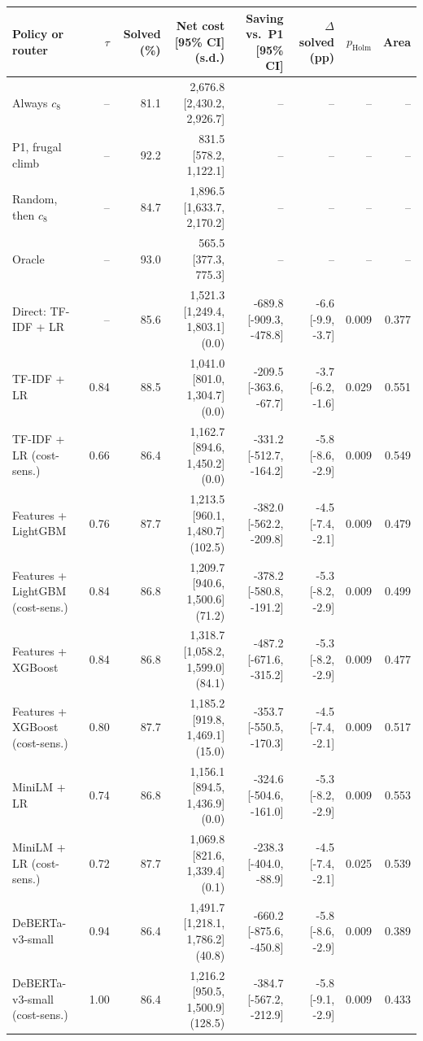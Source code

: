 \setlength{\tabcolsep}{4pt}
\begin{tabular}{@{}lrrrrrrr@{}}
\toprule
Policy or router & $\tau$ & Solved (\%) & Net cost [95\% CI] (s.d.) & Saving vs.\ P1 [95\% CI] & $\Delta$ solved (pp) & $p_{\mathrm{Holm}}$ & Area \\
\midrule
Always $c_8$ & -- & 81.1 & 2{,}676.8 [2{,}430.2, 2{,}926.7] & -- & -- & -- & -- \\
P1, frugal climb & -- & 92.2 & 831.5 [578.2, 1{,}122.1] & -- & -- & -- & -- \\
Random, then $c_8$ & -- & 84.7 & 1{,}896.5 [1{,}633.7, 2{,}170.2] & -- & -- & -- & -- \\
Oracle & -- & 93.0 & 565.5 [377.3, 775.3] & -- & -- & -- & -- \\
\midrule
Direct: TF-IDF + LR & -- & 85.6 & 1{,}521.3 [1{,}249.4, 1{,}803.1] (0.0) & -689.8 [-909.3, -478.8] & -6.6 [-9.9, -3.7] & 0.009 & 0.377 \\
TF-IDF + LR & 0.84 & 88.5 & 1{,}041.0 [801.0, 1{,}304.7] (0.0) & -209.5 [-363.6, -67.7] & -3.7 [-6.2, -1.6] & 0.029 & 0.551 \\
TF-IDF + LR (cost-sens.) & 0.66 & 86.4 & 1{,}162.7 [894.6, 1{,}450.2] (0.0) & -331.2 [-512.7, -164.2] & -5.8 [-8.6, -2.9] & 0.009 & 0.549 \\
Features + LightGBM & 0.76 & 87.7 & 1{,}213.5 [960.1, 1{,}480.7] (102.5) & -382.0 [-562.2, -209.8] & -4.5 [-7.4, -2.1] & 0.009 & 0.479 \\
Features + LightGBM (cost-sens.) & 0.84 & 86.8 & 1{,}209.7 [940.6, 1{,}500.6] (71.2) & -378.2 [-580.8, -191.2] & -5.3 [-8.2, -2.9] & 0.009 & 0.499 \\
Features + XGBoost & 0.84 & 86.8 & 1{,}318.7 [1{,}058.2, 1{,}599.0] (84.1) & -487.2 [-671.6, -315.2] & -5.3 [-8.2, -2.9] & 0.009 & 0.477 \\
Features + XGBoost (cost-sens.) & 0.80 & 87.7 & 1{,}185.2 [919.8, 1{,}469.1] (15.0) & -353.7 [-550.5, -170.3] & -4.5 [-7.4, -2.1] & 0.009 & 0.517 \\
MiniLM + LR & 0.74 & 86.8 & 1{,}156.1 [894.5, 1{,}436.9] (0.0) & -324.6 [-504.6, -161.0] & -5.3 [-8.2, -2.9] & 0.009 & 0.553 \\
MiniLM + LR (cost-sens.) & 0.72 & 87.7 & 1{,}069.8 [821.6, 1{,}339.4] (0.1) & -238.3 [-404.0, -88.9] & -4.5 [-7.4, -2.1] & 0.025 & 0.539 \\
DeBERTa-v3-small & 0.94 & 86.4 & 1{,}491.7 [1{,}218.1, 1{,}786.2] (40.8) & -660.2 [-875.6, -450.8] & -5.8 [-8.6, -2.9] & 0.009 & 0.389 \\
DeBERTa-v3-small (cost-sens.) & 1.00 & 86.4 & 1{,}216.2 [950.5, 1{,}500.9] (128.5) & -384.7 [-567.2, -212.9] & -5.8 [-9.1, -2.9] & 0.009 & 0.433 \\

\end{tabular}
